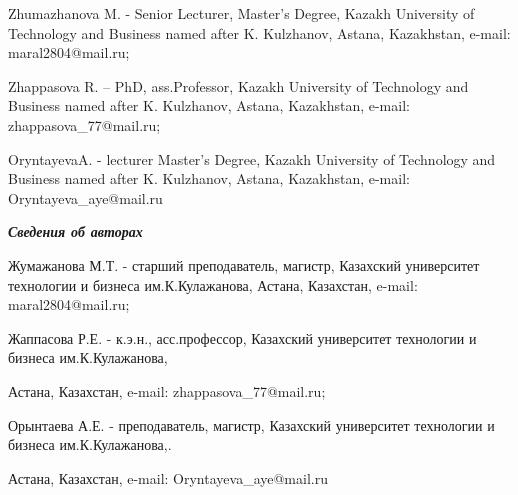 Zhumazhanova M. - Senior Lecturer, Master's Degree, Kazakh University of
Technology and Business named after K. Kulzhanov, Astana, Kazakhstan,
e-mail: maral2804@mail.ru;

Zhappasova R. -- PhD, ass.Professor, Kazakh University of Technology and
Business named after K. Kulzhanov, Astana, Kazakhstan, e-mail:
zhappasova\_77@mail.ru;

OryntayevaA. - lecturer Master's Degree, Kazakh University of Technology
and Business named after K. Kulzhanov, Astana, Kazakhstan, e-mail:
Oryntayeva\_aye@mail.ru

\emph{{\bfseries Сведения об авторах}}

Жумажанова М.Т. - старший преподаватель, магистр, Казахский университет
технологии и бизнеса им.К.Кулажанова, Астана, Казахстан, e-mail:
maral2804@mail.ru;

Жаппасова Р.Е. - к.э.н., асс.профессор, Казахский университет технологии
и бизнеса им.К.Кулажанова,

Астана, Казахстан, e-mail: zhappasova\_77@mail.ru;

Орынтаева А.Е. - преподаватель, магистр, Казахский университет
технологии и бизнеса им.К.Кулажанова,.

Астана, Казахстан, e-mail: Oryntayeva\_aye@mail.ru